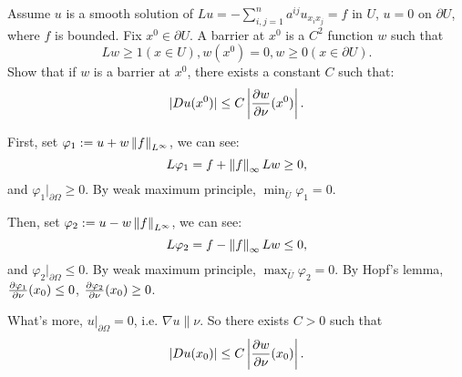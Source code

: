\begin{exercise}
    Assume $u$ is a smooth solution of $Lu=-\sum_{i,j=1}^{n}a^{ij}u_{x_{i}x_{j}}=f$ in $U$, $u=0$ on $\partial U$, where $f$ is bounded. Fix $x^{0}\in\partial U$. A barrier at $x^{0}$ is a $C^{2}$ function $w$ such that
    \begin{equation}
        Lw\ge 1(x\in U),w(x^{0})=0,w\ge 0(x\in\partial U).
    \end{equation}
    Show that if $w$ is a barrier at $x^{0}$, there exists a constant $C$ such that:
    \begin{equation}
        |Du(x^{0})|\le C\left|\frac{\partial w}{\partial \nu}(x^{0})\right|.
    \end{equation}
\end{exercise}
\begin{solution}
    First, set $\varphi_{1}:=u+w\left\|f\right\|_{L^{\infty}}$, we can see:
    \begin{equation}
        L\varphi_{1}=f+\left\|f\right\|_{\infty}Lw\ge 0,
    \end{equation}
    and $\varphi_{1}|_{\partial\Omega}\ge 0$. By weak maximum principle, $\min_{\bar{U}}\varphi_{1}=0$. 

    Then, set $\varphi_{2}:=u-w\left\|f\right\|_{L^{\infty}}$, we can see:
    \begin{equation}
        L\varphi_{2}=f-\left\|f\right\|_{\infty}Lw\le 0,
    \end{equation}
    and $\varphi_{2}|_{\partial\Omega}\le 0$. By weak maximum principle, $\max_{\bar{U}}\varphi_{2}=0$. By Hopf's lemma, $\frac{\partial \varphi_{1}}{\partial \nu}(x_{0})\le 0$, $\frac{\partial \varphi_{2}}{\partial \nu}(x_{0})\ge 0$.

    What's more, $u|_{\partial\Omega}=0$, i.e. $\nabla u\parallel \nu$. So there exists $C>0$ such that 
    \begin{equation}
        |Du(x_{0})|\le C\left|\frac{\partial w}{\partial \nu}(x_{0})\right|.
    \end{equation}
\end{solution}